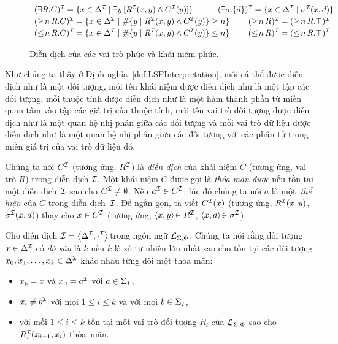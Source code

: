 \begin{figure}
{\[\begin{array}{l}
%
		(\E R.C)^\mI = \{ x \in \Delta^\mI \mid \E y\,[R^\mI(x,y) \wedge C^\mI(y)]\}\qquad\quad (\E \sigma.\{d\})^\mI = \{ x \in \Delta^\mI \mid \sigma^\mI(x,d)\} \\[0.5ex]
%
		(\geq\!n\,R.C)^\mI = \{x \in \Delta^\mI \mid \#\{y \mid R^\mI(x,y) \wedge C^\mI(y)\} \geq n\} \qquad\; (\geq\!n\,R)^\mI = (\geq\!n\,R.\top)^\mI \\[0.5ex]
%
		(\leq\!n\,R.C)^\mI = \{x \in \Delta^\mI \mid \#\{y \mid R^\mI(x,y) \wedge C^\mI(y)\} \leq n \} \qquad\; (\leq\!n\,R)^\mI = (\leq\!n\,R.\top)^\mI
	\end{array}
	\vspace{-2.5ex}
	\]}
\caption{Diễn dịch của các vai trò phức và khái niệm phức.\label{fig:LSPInterpretation}}
\end{figure}

Như chúng ta thấy ở Định nghĩa~\ref{def:LSPInterpretation}, mỗi cá thể được diễn dịch như là một đối tượng, mỗi tên khái niệm được diễn dịch như là một tập các đối tượng, mỗi thuộc tính được diễn dịch như là một hàm thành phần từ miền quan tâm vào tập các giá trị của thuộc tính, mỗi tên vai trò đối tượng được diễn dịch như là một quan hệ nhị phân  giữa các đối tượng và mỗi vai trò dữ liệu được diễn dịch như là một quan hệ nhị phân giữa các đối tượng với các phần tử trong miền giá trị của vai trò dữ liệu đó.

Chúng ta nói $C^{\mathcal{I}}$ (tương ứng, $R^{\mathcal{I}}$) là {\em diễn dịch} của khái niệm $C$ (tương ứng, vai trò $R$) trong diễn dịch $\mathcal{I}$.
Một khái niệm $C$ được gọi là {\em thỏa mãn được} nếu tồn tại một diễn dịch~$\mathcal{I}$ sao cho $C^{\mathcal{I}} \not= \emptyset$.
Nếu $a^{\mathcal{I}} \in C^{\mathcal{I}}$, lúc đó chúng ta nói $a$ là một~{\em thể hiện} của $C$ trong diễn dịch~$\mathcal{I}$. Để ngắn gọn, ta viết $C^{\mathcal{I}}(x)$ (tương ứng, $R^{\mathcal{I}}(x,y)$, $\sigma^{\mathcal{I}}(x, d)$) thay cho $x \in C^{\mathcal{I}}$ (tương ứng, $\left\langle x, y\right\rangle\! \in R^{\mathcal{I}}$, $\left\langle x, d\right\rangle\! \in \sigma^{\mathcal{I}}$).

Cho diễn dịch $\mathcal{I} = \left\langle\Delta^{\mathcal{I}}, \cdot^{\mathcal{I}}\right\rangle\!$ trong ngôn ngữ $\mathcal{L}_{\Sigma,\Phi}$. Chúng ta nói rằng đối tượng $x \in \Delta^{\mathcal{I}}$ có {\em độ sâu} là $k$ nếu $k$ là số tự nhiên lớn nhất sao cho tồn tại các đối tượng $x_0, x_1, \ldots, x_k \in \Delta^{\mathcal{I}}$ khác nhau từng đôi một thỏa mãn:
\begin{itemize}
	\item $x_k = x$ và $x_0 = a^{\mathcal{I}}$ với $a \in \Sigma_I$,
	\item $x_i \not= b^{\mathcal{I}}$ với mọi $1 \leq i \leq k$ và với mọi $b \in \Sigma_I$,
	\item với mỗi $1 \leq i \leq k$ tồn tại một vai trò đối tượng $R_i$ của $\mathcal{L}_{\Sigma,\Phi}$ sao cho $R_i^{\mathcal{I}}(x_{i-1}, x_i)$ thỏa~mãn.
\end{itemize}

